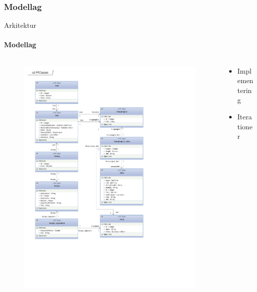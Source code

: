		\subsubsection{Modellag}
			\begin{frame}[t]{Arkitektur}\framesubtitle{Modellag}
				\begin{columns}[T]
				
					\begin{column}{.48\textwidth}
					\vspace{-29pt}
						\begin{figure}[h!]
							\centering
							\includegraphics[trim=1.4cm 6.1cm 6.5cm 1.8cm, clip, width=1.125\textwidth]{images/PFClasses_2.pdf} %
						\end{figure}
					\end{column}
					\begin{column}{.44\textwidth}
						\begin{itemize}
							\item Implementering
							\item Iterationer
						\end{itemize}
					\end{column}
				\end{columns}
			\end{frame}


